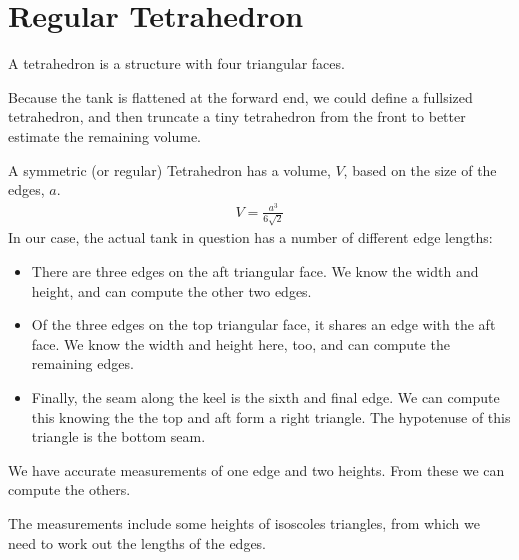 \documentclass[letterpaper,10pt,english]{sphinxmanual}
\begin{document}
\chapter{Regular Tetrahedron}
\label{\detokenize{tetrahedron:regular-tetrahedron}}\label{\detokenize{tetrahedron::doc}}
\sphinxAtStartPar
A tetrahedron is a structure with four triangular faces.

\sphinxAtStartPar
Because the tank is flattened at the forward end, we could define a full\sphinxhyphen{}sized tetrahedron, and
then truncate a tiny tetrahedron from the front to better estimate the remaining volume.

\sphinxAtStartPar
A symmetric (or regular) Tetrahedron has a volume, \(V\), based on the size of the edges, \(a\).
\begin{equation*}
\begin{split}
V = \frac{a^3}{6\sqrt{2}}
\end{split}
\end{equation*}
\sphinxAtStartPar
In our case, the actual tank in question has a number of different edge lengths:
\begin{itemize}
\item {} 
\sphinxAtStartPar
There are three edges on the aft triangular face. We know the width and height, and can compute the other two edges.

\item {} 
\sphinxAtStartPar
Of the three edges on the top triangular face, it shares an edge with the aft face. We know the width and height here, too, and can compute the remaining edges.

\item {} 
\sphinxAtStartPar
Finally, the seam along the keel is the sixth and final edge. We can compute this knowing the the top and aft form a right triangle. The hypotenuse of this triangle is the bottom seam.

\end{itemize}

\sphinxAtStartPar
We have accurate measurements of one edge and two heights. From these we can compute the others.

\begin{sphinxVerbatim}[commandchars=\\\{\}]
   
\end{sphinxVerbatim}

\sphinxAtStartPar
The measurements include some heights of isoscoles triangles, from which we need to work out the lengths of the edges.
\end{document}
